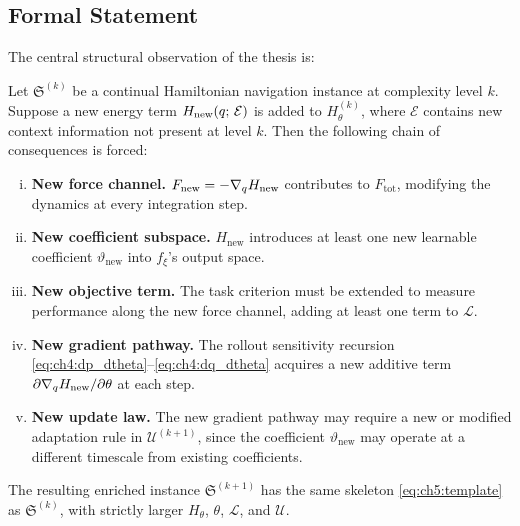 \subsection{Formal Statement}
\label{subsec:ch5:principle_formal}

The central structural observation of the thesis is:

\begin{theorem}
\label{thm:ch5:enrichment}
Let $\mathfrak{S}^{(k)}$ be a continual Hamiltonian navigation
instance at complexity level $k$.
Suppose a new energy term $H_{\mathrm{new}}(q;\,\mathcal{E})$ is
added to $H_\theta^{(k)}$, where $\mathcal{E}$ contains new context
information not present at level $k$.
Then the following chain of consequences is forced:

\begin{enumerate}[(i)]
  \item \textbf{New force channel.}
        $F_{\mathrm{new}} = -\nabla_q H_{\mathrm{new}}$ contributes
        to $F_{\mathrm{tot}}$, modifying the dynamics at every
        integration step.

  \item \textbf{New coefficient subspace.}
        $H_{\mathrm{new}}$ introduces at least one new learnable
        coefficient $\vartheta_{\mathrm{new}}$ into $f_\xi$'s output
        space.

  \item \textbf{New objective term.}
        The task criterion must be extended to measure performance
        along the new force channel, adding at least one term to
        $\mathcal{L}$.

  \item \textbf{New gradient pathway.}
        The rollout sensitivity recursion
        \eqref{eq:ch4:dp_dtheta}--\eqref{eq:ch4:dq_dtheta}
        acquires a new additive term
        $\partial\nabla_q H_{\mathrm{new}}/\partial\theta$
        at each step.

  \item \textbf{New update law.}
        The new gradient pathway may require a new or modified
        adaptation rule in $\mathcal{U}^{(k+1)}$, since the
        coefficient $\vartheta_{\mathrm{new}}$ may operate at a
        different timescale from existing coefficients.
\end{enumerate}

The resulting enriched instance $\mathfrak{S}^{(k+1)}$ has the same
skeleton \eqref{eq:ch5:template} as $\mathfrak{S}^{(k)}$, with
strictly larger $H_\theta$, $\theta$, $\mathcal{L}$, and $\mathcal{U}$.
\end{theorem}

